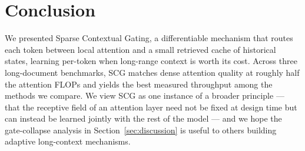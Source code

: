 \section{Conclusion}
\label{sec:conclusion}

We presented Sparse Contextual Gating, a differentiable mechanism that
routes each token between local attention and a small retrieved cache of
historical states, learning per-token when long-range context is worth its
cost. Across three long-document benchmarks, SCG matches dense attention
quality at roughly half the attention FLOPs and yields the best measured
throughput among the methods we compare. We view SCG as one instance of a
broader principle --- that the receptive field of an attention layer need
not be fixed at design time but can instead be learned jointly with the rest
of the model --- and we hope the gate-collapse analysis in
Section~\ref{sec:discussion} is useful to others building adaptive
long-context mechanisms.
